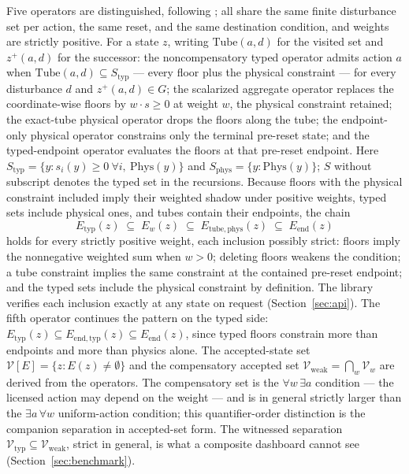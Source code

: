 \documentclass[3p,11pt]{elsarticle}
\begin{document}
Five operators are distinguished, following \citet{Abaee2026a}; all share
the same finite disturbance set per action, the same reset, and the same
destination condition, and weights are strictly positive. For a state $z$,
writing $\mathrm{Tube}(a,d)$ for the visited set and $z^{+}(a,d)$ for the
successor: the noncompensatory typed operator admits action $a$ when
$\mathrm{Tube}(a,d) \subseteq S_{\mathrm{typ}}$ --- every floor plus the
physical constraint --- for every disturbance $d$ and $z^{+}(a,d) \in G$;
the scalarized aggregate operator replaces the coordinate-wise floors by
$w \cdot s \geq 0$ at weight $w$, the physical constraint retained; the
exact-tube physical operator drops the floors along the tube; the
endpoint-only physical operator constrains only the terminal pre-reset
state; and the typed-endpoint operator evaluates the floors at that
pre-reset endpoint. Here
$S_{\mathrm{typ}} = \{y : s_i(y) \geq 0\ \forall i,\ \mathrm{Phys}(y)\}$
and $S_{\mathrm{phys}} = \{y : \mathrm{Phys}(y)\}$; $S$ without subscript
denotes the typed set in the recursions. Because floors with the physical
constraint included imply their weighted shadow under positive weights,
typed sets include physical ones, and tubes contain their endpoints, the
chain
\[
E_{\mathrm{typ}}(z) \;\subseteq\; E_w(z) \;\subseteq\;
E_{\mathrm{tube,phys}}(z) \;\subseteq\; E_{\mathrm{end}}(z)
\]
holds for every strictly positive weight, each inclusion possibly strict:
floors imply the nonnegative weighted sum when $w > 0$; deleting floors
weakens the condition; a tube constraint implies the same constraint at
the contained pre-reset endpoint; and the typed sets include the physical
constraint by definition. The library verifies each inclusion exactly at
any state on request (Section~\ref{sec:api}). The fifth operator continues the
pattern on the typed side: $E_{\mathrm{typ}}(z) \subseteq
E_{\mathrm{end,typ}}(z) \subseteq E_{\mathrm{end}}(z)$, since typed floors
constrain more than endpoints and more than physics alone. The accepted-state set
$\mathcal{V}[E] = \{ z : E(z) \neq \emptyset \}$ and the compensatory
accepted set $\mathcal{V}_{\mathrm{weak}} = \bigcap_w \mathcal{V}_w$ are
derived from the operators. The compensatory set is the
$\forall w\, \exists a$ condition --- the licensed action may depend on
the weight --- and is in general strictly larger than the
$\exists a\, \forall w$ uniform-action condition; this quantifier-order
distinction is the companion separation in accepted-set form. The
witnessed separation
$\mathcal{V}_{\mathrm{typ}} \subseteq \mathcal{V}_{\mathrm{weak}}$, strict in
general, is what a composite dashboard cannot see (Section~\ref{sec:benchmark}).
\end{document}
